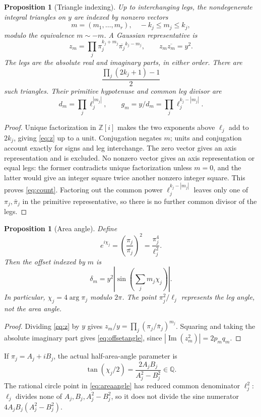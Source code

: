 \documentclass[11pt,letterpaper]{article}
\newtheorem{proposition}[theorem]{Proposition}
\theoremstyle{definition}\newtheorem{definition}[theorem]{Definition}
\theoremstyle{remark}\newtheorem{remark}[theorem]{Remark}
\newcommand{\Q}{\mathbb Q}\newcommand{\Z}{\mathbb Z}\newcommand{\R}{\mathbb R}
\newcommand{\im}{\operatorname{Im}}\newcommand{\Impart}{\operatorname{Im}}
\begin{document}
\begin{proposition}[Triangle indexing]\label{prop:index}
Up to interchanging legs, the nondegenerate integral triangles on $y$ are indexed by nonzero vectors
\[
m=(m_1,\ldots,m_r),\quad -k_j\le m_j\le k_j,
\]
modulo the equivalence $m\sim-m$. A Gaussian representative is
\begin{equation}\label{eq:z}
z_m=\prod_j\pi_j^{k_j+m_j}\overline{\pi_j}^{k_j-m_j},
\qquad z_m\overline{z_m}=y^2.
\end{equation}
The legs are the absolute real and imaginary parts, in either order. There are
\begin{equation}\label{eq:count}
\frac{\prod_j(2k_j+1)-1}{2}
\end{equation}
such triangles. Their primitive hypotenuse and common leg divisor are
\[
d_m=\prod_j\ell_j^{|m_j|},\qquad
 g_m=y/d_m=\prod_j\ell_j^{k_j-|m_j|}.
\]
\end{proposition}
\begin{proof}
Unique factorization in $\Z[i]$ makes the two exponents above $\ell_j$ add to $2k_j$, giving \eqref{eq:z} up to a unit. Conjugation negates $m$; units and conjugation account exactly for signs and leg interchange. The zero vector gives an axis representation and is excluded. No nonzero vector gives an axis representation or equal legs: the former contradicts unique factorization unless $m=0$, and the latter would give an integer square twice another nonzero integer square. This proves \eqref{eq:count}. Factoring out the common power $\ell_j^{k_j-|m_j|}$ leaves only one of $\pi_j,\bar\pi_j$ in the primitive representative, so there is no further common divisor of the legs.
\end{proof}

\begin{proposition}[Area angle]\label{prop:angle}
Define
\begin{equation}\label{eq:areaangle}
e^{i\chi_j}=\left(\frac{\pi_j}{\overline{\pi_j}}\right)^2
=\frac{\pi_j^4}{\ell_j^2}.
\end{equation}
Then the offset indexed by $m$ is
\begin{equation}\label{eq:offsetangle}
\delta_m=y^2\left|\sin\left(\sum_jm_j\chi_j\right)\right|.
\end{equation}
In particular, $\chi_j=4\arg\pi_j$ modulo $2\pi$. The point $\pi_j^2/\ell_j$ represents the leg angle, not the area angle.
\end{proposition}
\begin{proof}
Dividing \eqref{eq:z} by $y$ gives $z_m/y=\prod_j(\pi_j/\bar\pi_j)^{m_j}$. Squaring and taking the absolute imaginary part gives \eqref{eq:offsetangle}, since $|\im(z_m^2)|=2p_mq_m$.
\end{proof}
If $\pi_j=A_j+iB_j$, the actual half-area-angle parameter is
\[
\tan(\chi_j/2)=\frac{2A_jB_j}{A_j^2-B_j^2}\in\Q.
\]
The rational circle point in \eqref{eq:areaangle} has reduced common denominator $\ell_j^2$: $\ell_j$ divides none of $A_j,B_j,A_j^2-B_j^2$, so it does not divide the sine numerator $4A_jB_j(A_j^2-B_j^2)$.
\end{document}

